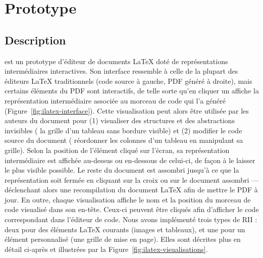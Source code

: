 \section{Prototype}
\label{sec:prototype}

\subsection{Description}
\iLaTeX{} est un prototype d'éditeur de documents \LaTeX{} doté de représentations intermédiaires interactives.
Son interface ressemble à celle de la plupart des éditeurs \LaTeX{} traditionnels (code source à gauche, PDF généré à droite), mais certains éléments du PDF sont interactifs, de telle sorte qu'en cliquer un affiche la représentation intermédiaire associée au morceau de code qui l'a généré ({Figure~\ref{fig:ilatex-interface}}).
Cette visualisation peut alors être utilisée par les auteurs du document pour (1) visualiser des structures et des abstractions invisibles (\eg{} la grille d'un tableau sans bordure visible) et (2) modifier le code source du document (\eg{} réordonner les colonnes d'un tableau en manipulant sa grille).
Selon la position de l'élément cliqué sur l'écran, sa représentation intermédiaire est affichée au-dessus ou en-dessous de celui-ci, de façon à le laisser le plus visible possible.
Le reste du document est assombri jusqu'à ce que la représentation soit fermée en cliquant sur la croix ou sur le document assombri --- déclenchant alors une recompilation du document \LaTeX{} afin de mettre le PDF à jour.
En outre, chaque visualisation affiche le nom et la position du morceau de code visualisé dans son en-tête. Ceux-ci peuvent être cliqués afin d'afficher le code correspondant dans l'éditeur de code.
Nous avons implémenté trois types de RII : deux pour des éléments \LaTeX{} courants (images et tableaux), et une pour un élément personnalisé (une grille de mise en page).
Elles sont décrites plus en détail ci-après et illustrées par la {Figure~\ref{fig:ilatex-visualisations}}.

\begin{figure*}[h]
  \centering
  \caption{Interface du prototype. (1)~Éditeur de code; (2)~Pré-visualisation du PDF généré; (3)~Tableau disposant d'une RII (cliquable); (4)~Visualisation du code du tableau (affichée par dessus le PDF). La {Figure~\ref{fig:ilatex-visualisations}} illustre les différentes visualisations.}
  \label{fig:ilatex-interface}
\end{figure*}

